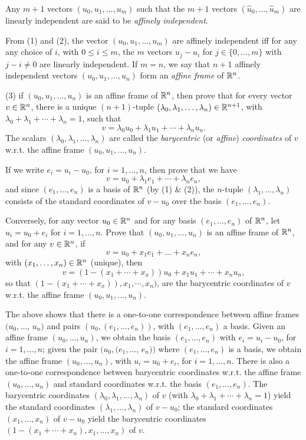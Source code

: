 \documentclass[12pt]{article}
\begin{document}
\medskip
Any $m + 1$ vectors  $(u_0, u_1, \ldots, u_{m })$ such that
the  $m + 1$ vectors
$(\widehat{u}_0, \ldots,  \widehat{u}_m)$ are linearly independent
are said to be {\it affinely independent\/}.

\medskip
From (1) and (2), the vector $(u_0, u_1, \ldots, u_{m })$ 
are affinely independent iff
for any  any choice of $i$, with $0 \leq i \leq m$, the
$m$ vectors $u_j - u_i$  for $j \in \{0, \ldots, m\}$ with $j - i \not = 0$
are linearly independent.
If $m = n$,  we say that $n + 1$ affinely independent 
vectors  $(u_0, u_1, \ldots, u_{n })$ form an {\it affine frame\/} of $\mathbb{R}^n$. 

\medskip
(3) if $(u_0, u_1, \ldots, u_{n })$ is an affine frame of $\mathbb{R}^n$,
then prove that for every vector $v\in \mathbb{R}^n$,  
there is a unique $(n + 1)$-tuple
$(\lambda_0, \lambda_1, \ldots, \lambda_n)\in \mathbb{R}^{n + 1}$, with
$\lambda_0 + \lambda_1 + \cdots + \lambda_n = 1$, such that
\[
v = \lambda_0 u_0 + \lambda_1 u_1 + \cdots + \lambda_n u_n.
\]
The scalars $(\lambda_0, \lambda_1, \ldots, \lambda_n)$ are called the
{\it barycentric\/} (or {\it affine\/}) {\it coordinates\/} of $v$
w.r.t. the affine frame   $(u_0, u_1, \ldots, u_{n })$.

\medskip
If we write $e_i = u_i -  u_0$, for $i = 1, \ldots, n$, then prove that
we have
\[
v = u_0 + \lambda_1 e_1 + \cdots + \lambda_n e_n,
\]
and since $(e_1, \ldots, e_n)$ is a basis of $\mathbb{R}^n$ (by (1) \&
(2)), the $n$-tuple $(\lambda_1, \ldots, \lambda_n)$ consists of the 
standard coordinates of $v - u_0$ over the basis $(e_1, \ldots, e_n)$.

\medskip
Conversely, for any vector $u_0\in \mathbb{R}^n$ and for any basis
$(e_1, \ldots, e_n)$ of $\mathbb{R}^n$, let
$u_i = u_0 + e_i$ for $i = 1, \ldots, n$. Prove
that $(u_0, u_1, \ldots, u_n)$ is an affine frame of $\mathbb{R}^n$, 
and for any $v\in \mathbb{R}^n$, if  
\[
v = u_0 + x_1 e_1 + \dots + x_n e_n,
\]
with $(x_1, \ldots, x_n) \in \mathbb{R}^n$ (unique), then
\[
v = (1 - (x_1 + \cdots + x_x)) u_0 + x_1 u_1 + \cdots + x_n u_n,
\]
so that $(1 - (x_1 + \cdots + x_x)), x_1, \cdots,  x_n)$,
are the barycentric coordinates of $v$ w.r.t. the affine frame
$(u_0, u_1, \ldots, u_n)$.

\medskip
The above shows that there is a one-to-one correspondence between
affine frames $(u_0, \ldots$, $u_n)$ and pairs
$(u_0, (e_1, \ldots, e_n))$, with  $(e_1, \ldots, e_n)$  a basis.
Given  an affine frame  $(u_0, \ldots, u_n)$, we obtain the basis
$(e_1, \ldots, e_n)$ with $e_i = u_i - u_0$, for $i = 1, \ldots, n$;
given the pair $(u_0, (e_1, \ldots$, $e_n))$ where  $(e_1, \ldots, e_n)$
is a basis,  we obtain the affine frame   $(u_0, \ldots, u_n)$, with
$u_i = u_0 + e_i$, for $i = 1, \ldots, n$.
There is also a  one-to-one correspondence between
barycentric coordinates w.r.t. the affine frame
$(u_0, \ldots, u_n)$ and standard coordinates w.r.t.
the basis   $(e_1, \ldots, e_n)$.
The barycentric coordinates $(\lambda_0, \lambda_1, \ldots, \lambda_n)$
of $v$
(with $\lambda_0 + \lambda_1 + \cdots + \lambda_n = 1$) 
yield the standard coordinates $(\lambda_1, \ldots, \lambda_n)$ of $v - u_0$;
the standard coordinates $(x_1, \ldots, x_n)$ of $v - u_0$ yield the 
barycentric coordinates $(1 - (x_1 + \cdots + x_n ), x_1, \ldots,
x_n)$ of $v$.
\end{document}
